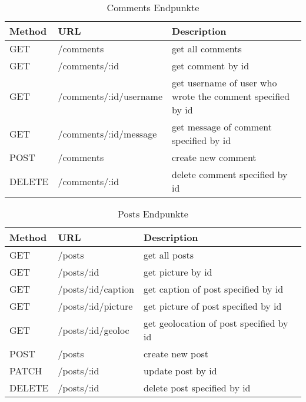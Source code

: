 \begin{table}[!htb]
    \begin{tabularx}{\textwidth}{|X|X|X|}
        \hline
        \textbf{Method} & \textbf{URL} & \textbf{Description} \\
        \hline
        \hline

    GET & /comments & get all comments\\
    \hline
    GET & /comments/:id & get comment by id\\
    \hline
    GET & /comments/:id/username & get username of user who wrote the comment specified by id\\
    \hline
    GET & /comments/:id/message & get message of comment specified by id\\
    \hline
    POST & /comments & create new comment\\
    \hline
    DELETE & /comments/:id & delete comment specified by id\\
    \hline
\end{tabularx}
\caption{Comments Endpunkte}
\label{commentsendpunkte}
\end{table}

\begin{table}[!htb]
    \begin{tabularx}{\textwidth}{|X|X|X|}
        \hline
        \textbf{Method} & \textbf{URL} & \textbf{Description} \\
        \hline
        \hline
    GET & /posts & get all posts\\
    \hline
    GET & /posts/:id & get picture by id\\
    \hline
    GET & /posts/:id/caption & get caption of post specified by id\\
    \hline
    GET & /posts/:id/picture & get picture of post specified by id\\
    \hline
    GET & /posts/:id/geoloc & get geolocation of post specified by id\\
    \hline
    POST & /posts & create new post\\
    \hline
    PATCH & /posts/:id & update post by id\\
    \hline
    DELETE & /posts/:id & delete post specified by id\\
    \hline
\end{tabularx}
\caption{Posts Endpunkte}
\label{postsendpunkte}
\end{table}

